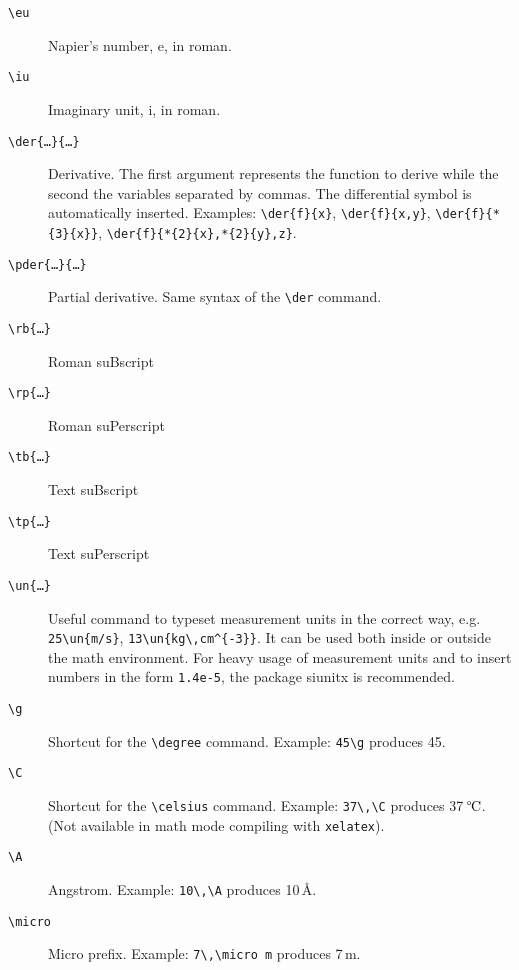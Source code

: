 \documentclass[a5paper,12pt]{article}
\newcommand{\bs}{\textbackslash}
\providecommand{\degree}{\mbox{\textdegree}}
\providecommand{\g}{\degree}
\providecommand{\celsius}{\ensuremath{\textrm{\upshape\textdegree}\kern-\scriptspace\mathrm{C}}}
\providecommand{\C}{\celsius}
\providecommand{\angstrom}{\mbox{\AA}}
\providecommand{\A}{\angstrom}
\providecommand{\micro}{\mbox{\textmu}}
\begin{document}
\begin{description}
\item[\texttt{\bs eu}] Napier's number, $\mathrm{e}$,  in roman.

\item[\texttt{\bs iu}] Imaginary unit, $\mathrm{i}$,  in roman.

\item[\texttt{\bs der\{\dots\}\{\dots\}}] Derivative. The first argument represents the function to derive while the second the variables separated by commas. The differential symbol is automatically inserted. Examples:
\texttt{\bs der\{f\}\{x\}}, \texttt{\bs der\{f\}\{x,y\}}, \texttt{\bs der\{f\}\{*\{3\}\{x\}\}}, 
\texttt{\bs der\{f\}\{*\{2\}\{x\},*\{2\}\{y\},z\}}.

\item[\texttt{\bs pder\{\dots\}\{\dots\}}] Partial derivative. Same syntax of the \texttt{\bs der} command.

\item[\texttt{\bs rb\{\dots\}}] Roman suBscript

\item[\texttt{\bs rp\{\dots\}}] Roman suPerscript

\item[\texttt{\bs tb\{\dots\}}] Text suBscript

\item[\texttt{\bs tp\{\dots\}}] Text suPerscript

\item[\texttt{\bs un\{\dots\}}] Useful command to typeset measurement units in the correct way, e.g. \texttt{25\bs un\{m/s\}},
\texttt{13\bs un\{kg\bs ,cm\^{}\{-3\}\}}. It can be used both inside or outside the math environment.
For heavy usage of measurement units and to insert numbers in the form
\texttt{1.4e-5}, the package \textsf{siunitx} is recommended.

\item[\texttt{\bs g}] Shortcut for the \texttt{\bs degree} command. Example: \texttt{45\bs g} produces 45\g.

\item[\texttt{\bs C}] Shortcut for the \texttt{\bs celsius} command. Example: \texttt{37\bs ,\bs C} produces 37\,\C. (Not available in math mode compiling with \texttt{xelatex}).

\item[\texttt{\bs A}] Angstrom. Example: \texttt{10\bs ,\bs A} produces 10\,\A.

\item[\texttt{\bs micro}] Micro prefix. Example: \texttt{7\bs ,\bs micro m} produces 7\,\micro m.


\end{description}
\end{document}
